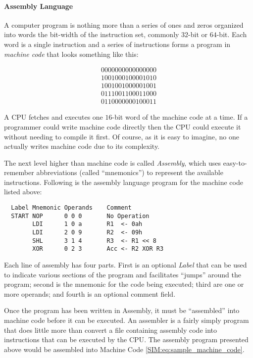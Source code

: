 \paragraph{Assembly Language} A computer program is nothing more than a series of ones and zeros organized into words the bit-width of the instruction set,  commonly $ 32 $-bit or $ 64 $-bit. Each word is a single instruction and a series of instructions forms a program in \emph{machine code} that looks something like this:

\begin{align}
  \label{SIM:eq:sample_machine_code}
  0000 0000 0000 0000\\
  \nonumber
  1001 0001 0000 1010\\
  \nonumber
  1001 0010 0000 1001\\
  \nonumber
  0111 0011 0001 1000\\
  \nonumber
  0110 0000 0010 0011
\end{align}

A \ac{CPU} fetches and executes one $ 16 $-bit word of the machine code at a time. If a programmer could write machine code directly then the \ac{CPU} could execute it without needing to compile it first. Of course, as it is easy to imagine, no one actually writes machine code due to its complexity. 

The next level higher than machine code is called \emph{Assembly}, which uses easy-to-remember abbreviations (called ``mnemonics'') to represent the available  instructions. Following is the assembly language program for the machine code listed above:

\begin{verbatim}
  Label Mnemonic Operands    Comment
  START NOP      0 0 0       No Operation
        LDI      1 0 a       R1  <- 0ah
        LDI      2 0 9       R2  <- 09h
        SHL      3 1 4       R3  <- R1 << 8
        XOR      0 2 3       Acc <- R2 XOR R3
\end{verbatim}

Each line of assembly has four parts. First is an optional \emph{Label} that can be used to indicate various sections of the program and facilitates ``jumps'' around the program; second is the mnemonic for the code being executed; third are one or more operands; and fourth is an optional comment field.


Once the program has been written in Assembly, it must be ``assembled'' into machine code before it can be executed. An assembler is a fairly simply program that does little more than convert a file containing assembly code into instructions that can be executed by the \ac{CPU}. The assembly program presented above would be assembled into Machine Code \ref{SIM:eq:sample_machine_code}.

